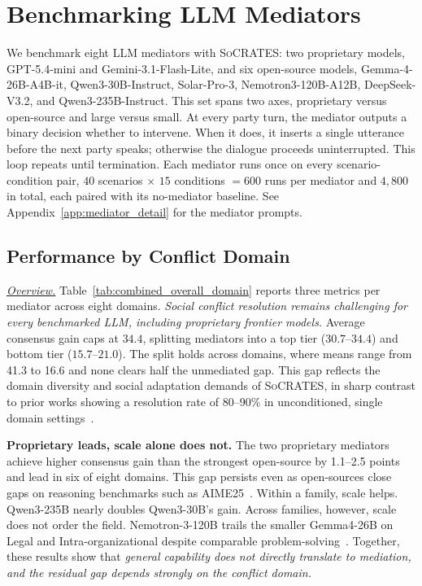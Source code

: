 \documentclass{llmxive}
\providecommand{\algname}{\textsc{SoCRATES}}
\begin{document}
\section{Benchmarking LLM Mediators}
\label{sec:experiments}

We benchmark eight LLM mediators with \algname{}: two proprietary models, GPT-5.4-mini and Gemini-3.1-Flash-Lite, and six open-source models, Gemma-4-26B-A4B-it, Qwen3-30B-Instruct, Solar-Pro-3, Nemotron3-120B-A12B, DeepSeek-V3.2, and Qwen3-235B-Instruct. This set spans two axes, proprietary versus open-source and large versus small. At every party turn, the mediator outputs a binary decision whether to intervene. When it does, it inserts a single utterance before the next party speaks; otherwise the dialogue proceeds uninterrupted. This loop repeats until termination.
%
Each mediator runs once on every scenario-condition pair, $40$ scenarios $\times$ $15$ conditions $= 600$ runs per mediator and $4{,}800$ in total, each paired with its no-mediator baseline. See Appendix~\ref{app:mediator_detail} for the mediator prompts.



\subsection{Performance by Conflict Domain}
\label{sec:results:domain}

\noindent\underline{\textit{Overview.}} Table~\ref{tab:combined_overall_domain} reports three metrics per mediator across eight domains. \emph{Social conflict resolution remains challenging for every benchmarked LLM, including proprietary frontier models.} Average consensus gain caps at $34.4$, splitting mediators into a top tier ($30.7$--$34.4$) and bottom tier ($15.7$--$21.0$). The split holds across domains, where means range from 41.3 to 16.6 and none clears half the unmediated gap. This gap reflects the domain diversity and social adaptation demands of \algname{}, in sharp contrast to prior works showing a resolution rate of 80--90\% in unconditioned, single domain settings~\citep{kwon2025evaluating, chen2026simulating}.


\smallskip\smallskip\noindent\textbf{Proprietary leads, scale alone does not.} The two proprietary mediators achieve higher consensus gain than the strongest open-source by 1.1--2.5 points and lead in six of eight domains. This gap persists even as open-sources close gaps on reasoning benchmarks such as AIME25~\citep{dekoninck2026matharena}. Within a family, scale helps. Qwen3-235B nearly doubles Qwen3-30B's gain. Across families, however, scale does not order the field. Nemotron-3-120B trails the smaller Gemma4-26B on Legal and Intra-organizational despite comparable problem-solving~\citep{chandiramani2026nemotron}. Together, these results show that \emph{general capability does not directly translate to mediation, and the residual gap depends strongly on the conflict domain.}
\end{document}
